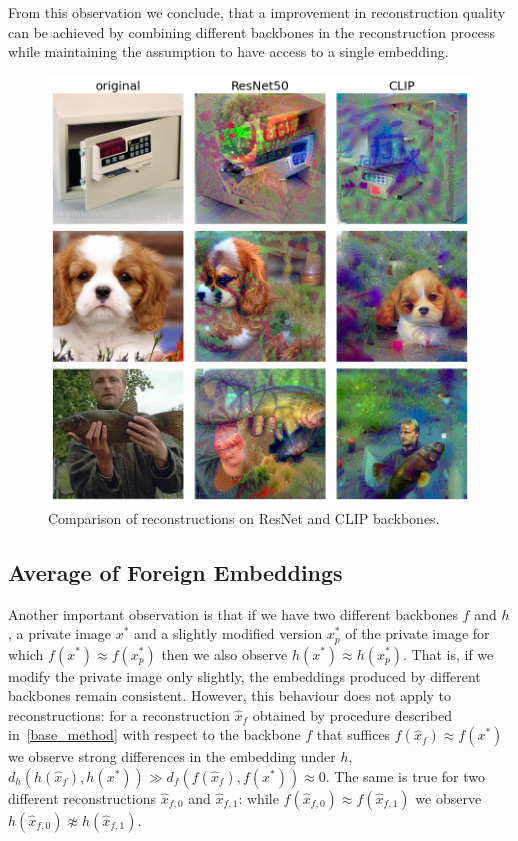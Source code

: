 \documentclass[10pt,twocolumn]{article}
\begin{document}
From this observation we conclude, that a improvement in reconstruction quality can be achieved by combining different backbones in the reconstruction process while maintaining the assumption to have access to a single embedding.
\begin{figure}[ht]
    \centering
    \includegraphics[width=\linewidth]{figures/resnet-vs-clip.png}
    \caption{
        Comparison of reconstructions on ResNet and CLIP backbones.
    }
    \label{fig:resnet_vs_clip}
\end{figure}

\subsection{Average of Foreign Embeddings}
Another important observation is that if we have two different backbones $f$ and $h$, a private image $x^*$ and a slightly modified version $x^*_p$ of the private image for which $f(x^*)\approx f(x^*_p)$ then we also observe $h(x^*)\approx h(x^*_p)$.
That is, if we modify the private image only slightly, the embeddings produced by different backbones remain consistent.
However, this behaviour does not apply to reconstructions: for a reconstruction $\hat x_f$ obtained by procedure described in~\ref{base_method} with respect to the backbone $f$ that suffices $f(\hat x_f)\approx f(x^*)$ we observe strong differences in the embedding under $h$, $d_h(h(\hat x_f),h(x^*)) \gg d_f(f(\hat x_f),f(x^*))\approx 0$.
The same is true for two different reconstructions $\hat x_{f,0}$ and $\hat x_{f,1}$: while $f(\hat x_{f,0})\approx f(\hat x_{f,1})$ we observe $h(\hat x_{f,0})\not\approx h(\hat x_{f,1})$.
\end{document}
